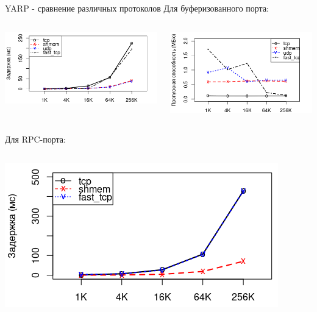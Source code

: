 \begin{frame}{YARP - сравнение различных протоколов}
Для буферизованного порта:
\begin{columns}[onlytextwidth]
	\begin{column}{0.5\textwidth}
		\includegraphics[width=\textwidth]{img/yarp/yarp_protocol_buf_l.png}
	\end{column}
	\begin{column}{0.5\textwidth}
		\includegraphics[width=\textwidth]{img/yarp/yarp_protocol_buf_bw.png}
	\end{column}
\end{columns}
Для RPC-порта:
\begin{columns}[onlytextwidth]
	\begin{column}{0.5\textwidth}
		\includegraphics[width=\textwidth]{img/yarp/yarp_protocol_rpc_l.png}

\end{column}
\end{columns}
\end{frame}
